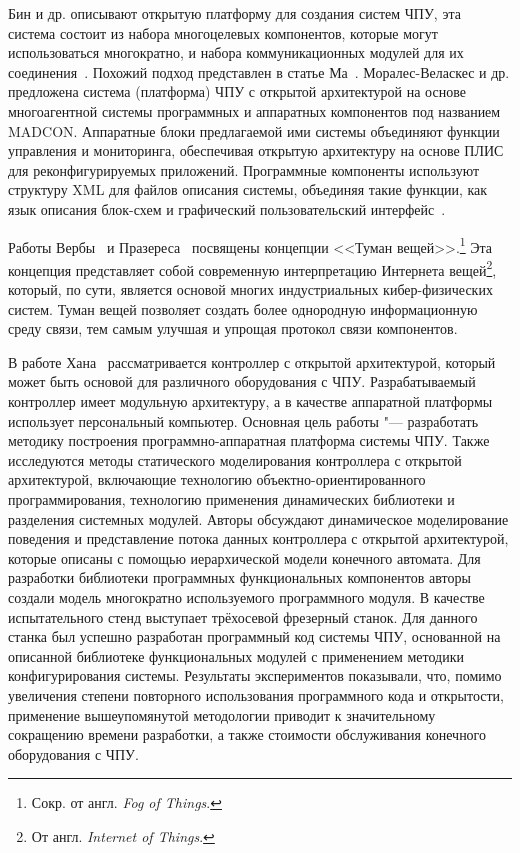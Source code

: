 Бин и др. описывают открытую платформу для создания систем ЧПУ, эта система состоит из набора многоцелевых компонентов, которые могут использоваться многократно, и набора коммуникационных модулей для их соединения~\cite {Bin200473}. Похожий подход представлен в статье Ма~\cite{MA2007272}.
Моралес-Веласкес и др. предложена система (платформа) ЧПУ с открытой архитектурой на основе многоагентной системы программных и аппаратных компонентов под названием MADCON. Аппаратные блоки предлагаемой ими системы объединяют функции управления и мониторинга, обеспечивая открытую архитектуру на основе ПЛИС для реконфигурируемых приложений. Программные компоненты используют структуру XML для файлов описания системы, объединяя такие функции, как язык описания блок-схем и графический пользовательский интерфейс~\cite{MoralesVelazquez2010407}.

Работы Вербы~\cite{Verba2016} и Празереса~\cite{Prazeres7471301} посвящены концепции <<Туман вещей>>.\footnote{Сокр. от англ. \textit{Fog of Things}.} Эта концепция представляет собой современную интерпретацию Интернета вещей\footnote{От англ. \textit{Internet of Things}.}, который, по сути, является основой многих индустриальных кибер-физических систем. Туман вещей позволяет создать более однородную информационную среду связи, тем самым улучшая и упрощая протокол связи компонентов.

В работе Хана~\cite{han2007development} рассматривается контроллер с открытой архитектурой, который может быть основой для различного оборудования с ЧПУ. Разрабатываемый контроллер имеет модульную архитектуру, а в качестве аппаратной  платформы использует персональный компьютер. Основная цель работы "--- разработать методику построения программно-аппаратная платформа системы ЧПУ. Также исследуются методы статического моделирования контроллера с открытой архитектурой, включающие технологию объектно-ориентированного программирования, технологию применения динамических библиотеки и разделения  системных модулей. Авторы обсуждают динамическое моделирование поведения  и представление потока данных контроллера с открытой архитектурой, которые  описаны с помощью иерархической модели конечного автомата. Для разработки  библиотеки программных функциональных компонентов авторы создали модель  многократно используемого программного модуля. В качестве испытательного  стенд выступает трёхосевой фрезерный станок. Для данного станка был успешно  разработан программный код системы ЧПУ, основанной на описанной библиотеке функциональных модулей с применением методики конфигурирования  системы. Результаты экспериментов показывали, что, помимо увеличения степени повторного использования программного кода и открытости, применение  вышеупомянутой методологии приводит к значительному сокращению времени  разработки, а также стоимости обслуживания конечного оборудования с ЧПУ.

